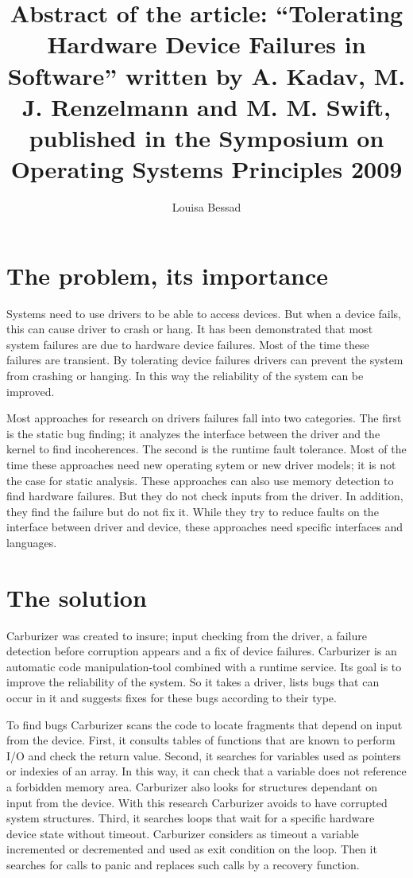 \documentclass[11pt]{article}
\title{\fontsize{15pt}{10pt}\selectfont\textbf{Abstract of the article: ``Tolerating Hardware Device Failures in Software'' written by A. Kadav, M. J. Renzelmann and M. M. Swift, published in the Symposium on Operating Systems Principles 2009}}
\author{Louisa Bessad}
\begin{document}
\maketitle

\section{The problem, its importance}
Systems need to use drivers to be able to access devices. But when a device fails, this can cause driver to crash or hang. It has been demonstrated that most system failures are due to hardware device failures. Most of the time these failures are transient. By tolerating device failures drivers can prevent the system from crashing or hanging. In this way the reliability of the system can be improved.

Most approaches for research on drivers failures fall into two categories. The first is the static bug finding; it analyzes the interface between the driver and the kernel to find incoherences. The second is the runtime fault tolerance. Most of the time these approaches need new operating sytem or new driver models; it is not the case for static analysis. These approaches can also use memory detection to find hardware failures. But they do not check inputs from the driver. In addition, they find the failure but do not fix it. While they try to reduce faults on the interface between driver and device, these approaches need specific interfaces and languages.

\section{The solution}
Carburizer was created to insure; input checking from the driver,  a failure detection before corruption appears and a fix of device failures. Carburizer is an automatic code manipulation-tool combined with a runtime service. Its goal is to improve the reliability of the system. So it takes a driver, lists bugs that can occur in it and suggests fixes for these bugs according to their type.

To find bugs Carburizer scans the code to locate fragments that depend on input from the device. First, it consults tables of functions that are known to perform I/O and check the return value. Second, it searches for variables used as pointers or indexies of an array. In this way, it can check that a variable does not reference a forbidden memory area. Carburizer also looks for structures dependant on input from the device. With this research Carburizer avoids to have corrupted system structures. Third, it searches loops that wait for a specific hardware device state without timeout. Carburizer considers as timeout a variable incremented or decremented and used as exit condition on the loop. Then it searches for calls to panic and replaces such calls by a recovery function.
\end{document}
